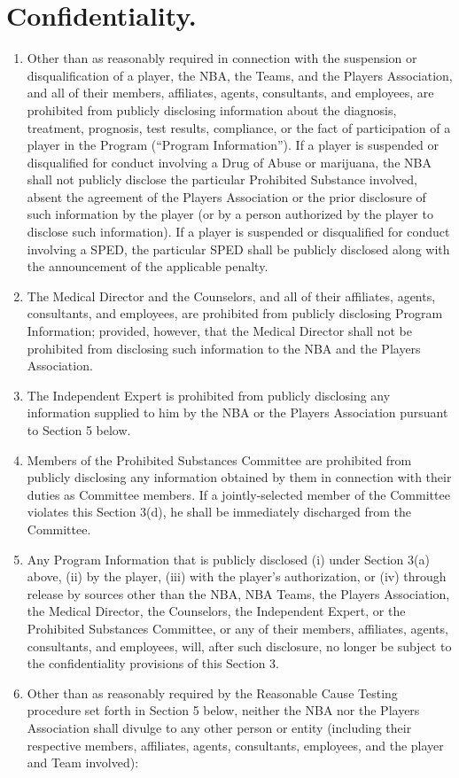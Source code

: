 \documentclass[
]{book}
\providecommand{\tightlist}{%
  \setlength{\itemsep}{0pt}\setlength{\parskip}{0pt}}
\begin{document}
\hypertarget{confidentiality.}{%
\section{Confidentiality.}\label{confidentiality.}}

\begin{enumerate}
\def\labelenumi{(\alph{enumi})}
\tightlist
\item
  Other than as reasonably required in connection with the suspension or disqualification of a player, the NBA, the Teams, and the Players Association, and all of their members, affiliates, agents, consultants, and employees, are prohibited from publicly disclosing information about the diagnosis, treatment, prognosis, test results, compliance, or the fact of participation of a player in the Program (``Program Information''). If a player is suspended or disqualified for conduct involving a Drug of Abuse or marijuana, the NBA shall not publicly disclose the particular Prohibited Substance involved, absent the agreement of the Players Association or the prior disclosure of such information by the player (or by a person authorized by the player to disclose such information). If a player is suspended or disqualified for conduct involving a SPED, the particular SPED shall be publicly disclosed along with the announcement of the applicable penalty.
\item
  The Medical Director and the Counselors, and all of their affiliates, agents, consultants, and employees, are prohibited from publicly disclosing Program Information; provided, however, that the Medical Director shall not be prohibited from disclosing such information to the NBA and the Players Association.
\item
  The Independent Expert is prohibited from publicly disclosing any information supplied to him by the NBA or the Players Association pursuant to Section 5 below.
\item
  Members of the Prohibited Substances Committee are prohibited from publicly disclosing any information obtained by them in connection with their duties as Committee members. If a jointly-selected member of the Committee violates this Section 3(d), he shall be immediately discharged from the Committee.
\item
  Any Program Information that is publicly disclosed (i) under Section 3(a) above, (ii) by the player, (iii) with the player's authorization, or (iv) through release by sources other than the NBA, NBA Teams, the Players Association, the Medical Director, the Counselors, the Independent Expert, or the Prohibited Substances Committee, or any of their members, affiliates, agents, consultants, and employees, will, after such disclosure, no longer be subject to the confidentiality provisions of this Section 3.
\item
  Other than as reasonably required by the Reasonable Cause Testing procedure set forth in Section 5 below, neither the NBA nor the Players Association shall divulge to any other person or entity (including their respective members, affiliates, agents, consultants, employees, and the player and Team involved):


\end{enumerate}
\end{document}
